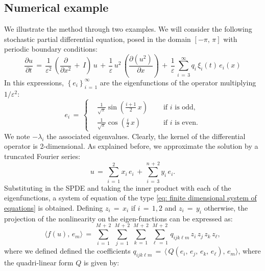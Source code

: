\subsection{Numerical example}
\label{sub:numerical_example}
We illustrate the method through two examples.
We will consider the following stochastic partial differential equation, posed in the domain $ [ -{\pi},\,{\pi}]$ with periodic boundary conditions:
\begin{equation}
    \frac{{\partial}u}{{\partial}t} \,=\,\frac{1}{{\varepsilon}^2}\, \left( \frac{\partial}{{\partial}x^2} \,+\,I\right)\,u \,+\, \frac{1}{\varepsilon} \, u^2\,\left(\frac{{\partial}(u^2)}{{\partial}x}\right) \,+\, \frac{1}{\varepsilon} \, \sum_{ i\,=\,3}^{ {\infty}}  q_i\,{\xi}_i(t)\, e_i(x)
    \label{eq: undefined label}
\end{equation}
In this expressions, $\left\{e_i\right\}_{i\,=\,1}^{\infty}$ are the eigenfunctions of the operator multiplying $1/{\varepsilon}^2$:
\begin{equation*}
    e_i \,=\, \left\{
        \begin{aligned}
            & \frac{1}{\sqrt{\pi}}\sin\left(\frac{i+1}{2}\,x\right) &\quad \text{ if $i$ is odd,} \\
            & \frac{1}{\sqrt {\pi}}\cos\left(\frac{i}{2}\,x\right) &\quad \text{ if $i$ is even.}
        \end{aligned} \right .
\end{equation*}
We note $-{\lambda}_i$ the associated eigenvalues.
Clearly, the kernel of the differential operator is 2-dimensional.
As explained before, we approximate the solution by a truncated Fourier series:
\begin{equation*}
    u \,=\, \sum_{ i\,=\,1}^{ 2} x_i\,e_i \,+\, \sum_{ i\,=\,3}^{ n\,+\,2} y_i \, e_i.
\end{equation*}
Substituting in the SPDE and taking the inner product with each of the eigenfunctions, a system of equation of the type \eqref{eq: finite dimensional system of equations} is obtained.
Defining $z_i \,=\, x_i$ if $i \,=\,1,2$ and $z_i \,=\,y_i$ otherwise, the projection of the nonlinearity on the eigen-functions can be expressed as:
\begin{equation}
    \langle f(u),\,e_m\rangle \,=\,\sum_{ i\,=\,1}^{ M\,+\,2}\, \sum_{ j\,=\,1}^{ M\,+\,2}\,\sum_{ k\,=\,1}^{ M\,+\,2}\,\sum_{ {\ell}\,=\,1}^{ M\,+\,2}\, q_{ijk{\ell}m} \, z_i\,z_j\,z_k\,z_{\ell},
    \label{eq: projection nonlin example 1}
\end{equation}
where we defined defined the coefficients $q_{ijk{\ell}m} \,=\, \langle\, Q(e_i,\,e_j,\,e_k,\,e_{\ell}),\,e_m \rangle$, where the quadri-linear form $Q$ is given by:

